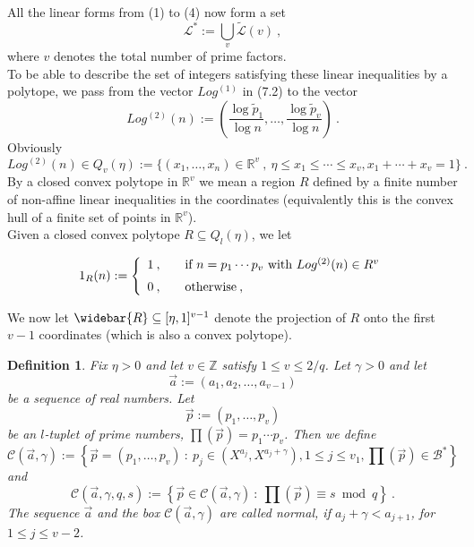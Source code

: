 \documentclass{amsart}
\numberwithin{equation}{subsection}
\newtheorem{definition}[theorem]{Definition}
\begin{document}
\noindent All the linear forms from (1) to (4) now form a set
\[
\mathcal{L}^*:=\bigcup_v \tilde{\mathcal{L}}(v)\:, \tag{7.3}
\]
where $v$ denotes the total number of prime factors.\\
To be able to describe the set of integers satisfying these linear inequalities by a polytope, we pass from the vector $Log^{(1)}$ in (7.2) to the vector
\[
Log^{(2)} (n) :=\left( \frac{\log \tilde{p}_1}{\log n} , \ldots,  \frac{\log \tilde{p}_v}{\log n}  \right)\:. \tag{7.3}
\]
Obviously
$$Log^{(2)} (n)\in Q_v(\eta):= \{(x_1, \ldots, x_n)\in\mathbb{R}^v\:,\ \eta\leq x_1\leq \cdots \leq x_v, x_1+\cdots+x_v= 1\}\:.$$
By a closed convex polytope in $\mathbb{R}^v$ we mean a region $R$ defined by a finite number of non-affine linear inequalities in the coordinates (equivalently this is the convex hull of a finite set of points in $\mathbb{R}^v$).\\
Given a closed convex polytope $R\subseteq Q_l(\eta)$, we let

\begin{eqnarray}
1_R(n):=\left\{ 
  \begin{array}{l l}
   1\:, & \quad \text{if $n=p_1\cdots p_v$ with $Log^{(2)}(n)\in R^v$}\vspace{2mm}\\ 
    0\:, & \quad \text{otherwise}\:,\\
  \end{array} \right.
\nonumber
\end{eqnarray}

We now let $\widebar{R}\subseteq [\eta, 1]^{v-1}$ denote the projection of $R$ onto the first $v-1$ coordinates (which is also a convex polytope).

\begin{definition}\label{def71}
Fix $\eta>0$ and let $v\in\mathbb{Z}$ satisfy $1\leq v\leq 2/q$. Let $\gamma>0$ and let
$$\vec{a}:=(a_1, a_2, \ldots, a_{v-1})$$
be a sequence of real numbers. Let 
$$\vec{p}:=(p_1, \ldots, p_v)$$
be an $l$-tuplet of prime numbers, $\prod(\vec{p})=p_1\cdots p_v$. Then we define
$$\mathcal{C}(\vec{a}, \gamma):= \left\{\vec{p}=(p_1, \ldots, p_v)\::\: p_j\in (X^{a_j}, X^{a_j+\gamma}), 1\leq j\leq v_1, \prod(\vec{p})\in\mathcal{B}^*\right\}$$
and 
$$\mathcal{C}(\vec{a}, \gamma, q, s):=\left\{\vec{p}\in \mathcal{C}(\vec{a}, \gamma)\::\: \prod(\vec{p})\equiv s \bmod q\right\}\:.$$
The sequence $\vec{a}$ and the box $\mathcal{C}(\vec{a}, \gamma)$ are called \textit{normal}, if $a_j+\gamma<a_{j+1}$, for \mbox{$1\leq j\leq v-2$.}
\end{definition}
\end{document}
